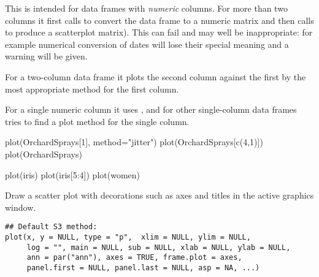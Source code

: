 %
\begin{Details}\relax
This is intended for data frames with \emph{numeric} columns. For more
than two columns it first calls  to convert
the data frame to a numeric matrix and then calls 
to produce a scatterplot matrix).  This can fail and may well be
inappropriate: for example numerical conversion of dates will lose
their special meaning and a warning will be given.

For a two-column data frame it plots the second column against the
first by the most appropriate method for the first column.

For a single numeric column it uses , and for
other single-column data frames tries to find a plot method for the
single column.
\end{Details}
%
\begin{SeeAlso}\relax
{}
\end{SeeAlso}
%
\begin{Examples}
\begin{ExampleCode}
plot(OrchardSprays[1], method="jitter")
plot(OrchardSprays[c(4,1)])
plot(OrchardSprays)

plot(iris)
plot(iris[5:4])
plot(women)
\end{ExampleCode}
\end{Examples}
%
\begin{Description}\relax
Draw a scatter plot with decorations such as axes and titles
in the active graphics window.
\end{Description}
%
\begin{Usage}
\begin{verbatim}
## Default S3 method:
plot(x, y = NULL, type = "p",  xlim = NULL, ylim = NULL,
     log = "", main = NULL, sub = NULL, xlab = NULL, ylab = NULL,
     ann = par("ann"), axes = TRUE, frame.plot = axes,
     panel.first = NULL, panel.last = NULL, asp = NA, ...)
\end{verbatim}
\end{Usage}
%
